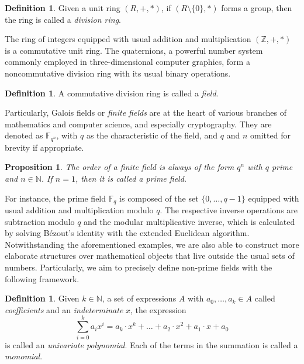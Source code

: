 \documentclass[draft, 12pt, a4paper, oneside]{memoir}
\newtheorem{proposition}[theorem]{Proposition}
\theoremstyle{definition}
\newtheorem{definition}[theorem]{Definition}
\begin{document}
\begin{definition}
  Given a unit ring $(R, +, \ast)$, if $(R \setminus \{0\}, \ast)$ forms a group, then the ring is called a \emph{division ring}.
\end{definition}

The ring of integers equipped with usual addition and multiplication $(\mathbb{Z}, +, \ast)$ is a commutative unit ring. The quaternions, a powerful number system commonly employed in three-dimensional computer graphics, form a noncommutative division ring with its usual binary operations.

\begin{definition}
  A commutative division ring is called a \emph{field}.
\end{definition}

Particularly, Galois fields or \emph{finite fields} are at the heart of various branches of mathematics and computer science, and especially cryptography. They are denoted as $\mathbb{F}_{q^{n}}$, with $q$ as the characteristic of the field, and $q$ and $n$ omitted for brevity if appropriate.

\begin{proposition}
  The order of a finite field is always of the form $q^{n}$ with $q$ prime and $n \in \mathbb{N}$. If $n = 1$, then it is called a \emph{prime field}.
\end{proposition}

For instance, the prime field $\mathbb{F}_{q}$ is composed of the set $\{0, \dots, q - 1\}$ equipped with usual addition and multiplication modulo $q$. The respective inverse operations are subtraction modulo $q$ and the modular multiplicative inverse, which is calculated by solving Bézout's identity with the extended Euclidean algorithm. Notwithstanding the aforementioned examples, we are also able to construct more elaborate structures over mathematical objects that live outside the usual sets of numbers. Particularly, we aim to precisely define non-prime fields with the following framework.

\begin{definition}
  Given $k \in \mathbb{N}$, a set of expressions $A$ with $a_{0}, \dots, a_{k} \in A$ called \emph{coefficients} and an \emph{indeterminate} $x$, the expression $$\sum_{i = 0}^{k} a_{i} x^{i} = a_{k} \cdot x^{k} + \dots + a_{2} \cdot x^{2} + a_{1} \cdot x + a_{0}$$ is called an \emph{univariate polynomial}. Each of the terms in the summation is called a \emph{monomial}.
\end{definition}
\end{document}
